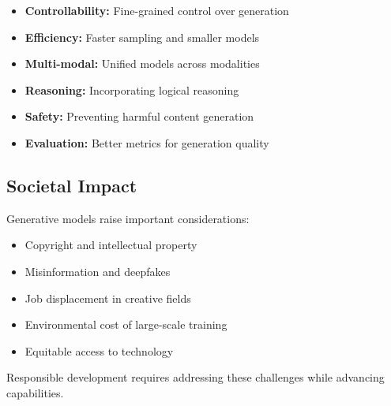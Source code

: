\begin{itemize}
    \item \textbf{Controllability:} Fine-grained control over generation
    \item \textbf{Efficiency:} Faster sampling and smaller models
    \item \textbf{Multi-modal:} Unified models across modalities
    \item \textbf{Reasoning:} Incorporating logical reasoning
    \item \textbf{Safety:} Preventing harmful content generation
    \item \textbf{Evaluation:} Better metrics for generation quality
\end{itemize}

\subsection{Societal Impact}

Generative models raise important considerations:
\begin{itemize}
    \item Copyright and intellectual property
    \item Misinformation and deepfakes
    \item Job displacement in creative fields
    \item Environmental cost of large-scale training
    \item Equitable access to technology
\end{itemize}

Responsible development requires addressing these challenges while advancing capabilities.
